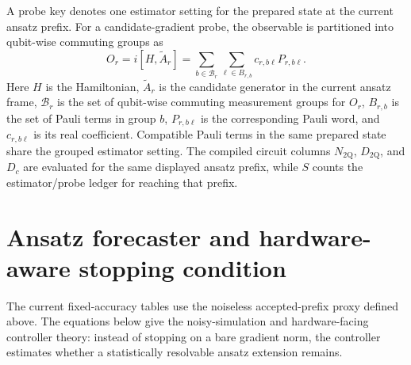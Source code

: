 \documentclass[
  reprint,
  amsmath,
  amssymb,
  aps,
  pra,
  nofootinbib,
  superscriptaddress,
  floatfix
]{revtex4-2}
\newcommand{\twq}{\mathrm{2Q}}
\begin{document}
A probe key denotes one estimator setting for the prepared state at the current ansatz prefix.  For a candidate-gradient probe, the observable is partitioned into qubit-wise commuting groups as
\begin{equation}
O_r=i[H,\widetilde A_r]
=\sum_{b\in\mathcal B_r}\sum_{\ell\in B_{r,b}}
c_{r,b\ell}P_{r,b\ell} .
\label{eq:appendix_grouped_gradient}
\end{equation}
Here \(H\) is the Hamiltonian, \(\widetilde A_r\) is the candidate generator in the current ansatz frame, \(\mathcal B_r\) is the set of qubit-wise commuting measurement groups for \(O_r\), \(B_{r,b}\) is the set of Pauli terms in group \(b\), \(P_{r,b\ell}\) is the corresponding Pauli word, and \(c_{r,b\ell}\) is its real coefficient. Compatible Pauli terms in the same prepared state share the grouped estimator setting.  The compiled circuit columns \(N_{\twq}\), \(D_{\twq}\), and \(D_c\) are evaluated for the same displayed ansatz prefix, while \(S\) counts the estimator/probe ledger for reaching that prefix.

\section{Ansatz forecaster and hardware-aware stopping condition}
\label{app:static_controller_details}
\label{app:static_ansatz_schedule_details}
\label{app:gradient_resolution_floor}

The current fixed-accuracy tables use the noiseless accepted-prefix proxy
defined above. The equations below give the noisy-simulation and
hardware-facing controller theory: instead of stopping on a bare gradient norm,
the controller estimates whether a statistically resolvable ansatz extension
remains.
\end{document}

